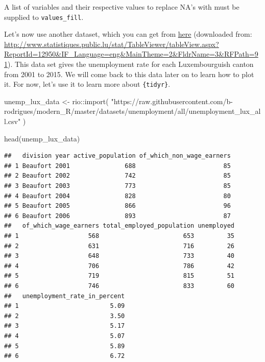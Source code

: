 \documentclass[
]{article}
\newenvironment{Shaded}{\begin{snugshade}}{\end{snugshade}}
\newcommand{\FunctionTok}[1]{\textcolor[rgb]{0.00,0.00,0.00}{#1}}
\newcommand{\NormalTok}[1]{#1}
\newcommand{\OtherTok}[1]{\textcolor[rgb]{0.56,0.35,0.01}{#1}}
\newcommand{\SpecialCharTok}[1]{\textcolor[rgb]{0.00,0.00,0.00}{#1}}
\newcommand{\StringTok}[1]{\textcolor[rgb]{0.31,0.60,0.02}{#1}}
\begin{document}
A list of variables and their respective values to replace NA's with must be supplied to \texttt{values\_fill}.

Let's now use another dataset, which you can get from
\href{https://github.com/b-rodrigues/modern_R/tree/master/datasets/unemployment/all}{here}
(downloaded from: \url{http://www.statistiques.public.lu/stat/TableViewer/tableView.aspx?ReportId=12950\&IF_Language=eng\&MainTheme=2\&FldrName=3\&RFPath=91}). This data set gives the unemployment rate for each Luxembourguish
canton from 2001 to 2015. We will come back to this data later on to learn how to plot it. For now,
let's use it to learn more about \texttt{\{tidyr\}}.

\begin{Shaded}
\begin{Highlighting}[]
\NormalTok{unemp\_lux\_data }\OtherTok{\textless{}{-}}\NormalTok{ rio}\SpecialCharTok{::}\FunctionTok{import}\NormalTok{(}
      \StringTok{"https://raw.githubusercontent.com/b{-}rodrigues/modern\_R/master/datasets/unemployment/all/unemployment\_lux\_all.csv"}
\NormalTok{                       )}

\FunctionTok{head}\NormalTok{(unemp\_lux\_data)}
\end{Highlighting}
\end{Shaded}

\begin{verbatim}
##   division year active_population of_which_non_wage_earners
## 1 Beaufort 2001               688                        85
## 2 Beaufort 2002               742                        85
## 3 Beaufort 2003               773                        85
## 4 Beaufort 2004               828                        80
## 5 Beaufort 2005               866                        96
## 6 Beaufort 2006               893                        87
##   of_which_wage_earners total_employed_population unemployed
## 1                   568                       653         35
## 2                   631                       716         26
## 3                   648                       733         40
## 4                   706                       786         42
## 5                   719                       815         51
## 6                   746                       833         60
##   unemployment_rate_in_percent
## 1                         5.09
## 2                         3.50
## 3                         5.17
## 4                         5.07
## 5                         5.89
## 6                         6.72
\end{verbatim}
\end{document}
